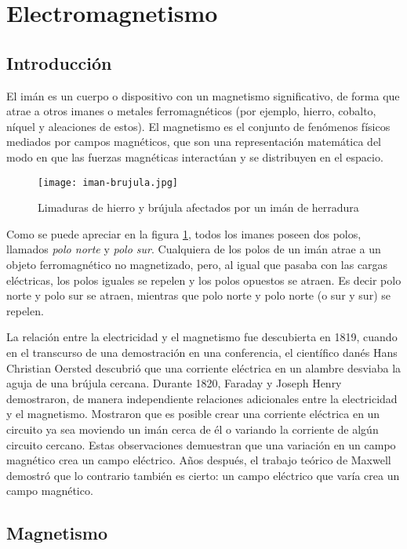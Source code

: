 \section{Electromagnetismo}

\subsection{Introducción}

El imán es un cuerpo o dispositivo con un magnetismo significativo, de forma que atrae a otros imanes o metales ferromagnéticos (por ejemplo, hierro, cobalto, níquel y aleaciones de estos). El magnetismo es el conjunto de fenómenos físicos mediados por campos magnéticos, que son una representación matemática del modo en que las fuerzas magnéticas interactúan y se distribuyen en el espacio.

\begin{figure}[ht]
  \centering
  \texttt{[image: iman-brujula.jpg]}
  \caption{Limaduras de hierro y brújula afectados por un imán de herradura}
  \label{fig:iman}
\end{figure}

Como se puede apreciar en la figura \ref{fig:iman}, todos los imanes poseen dos polos, llamados \textit{polo norte} y \textit{polo sur}. Cualquiera de los polos de un imán atrae a un objeto ferromagnético no magnetizado, pero, al igual que pasaba con las cargas eléctricas, los polos iguales se repelen y los polos opuestos se atraen. Es decir polo norte y polo sur se atraen, mientras que polo norte y polo norte (o sur y sur) se repelen.

La relación entre la electricidad y el magnetismo fue descubierta en 1819, cuando en el transcurso de una demostración en una conferencia, el científico danés Hans Christian Oersted descubrió que una corriente eléctrica en un alambre desviaba la aguja de una brújula cercana. Durante 1820, Faraday y Joseph Henry demostraron, de manera independiente relaciones adicionales entre la electricidad y el magnetismo. Mostraron que es posible crear una corriente eléctrica en un circuito ya sea moviendo un imán cerca de él o variando la corriente de algún circuito cercano. Estas observaciones demuestran que una variación en un campo magnético crea un campo eléctrico. Años después, el trabajo teórico de Maxwell demostró que lo contrario también es cierto: un campo eléctrico que varía crea un campo magnético.

\subsection{Magnetismo}

